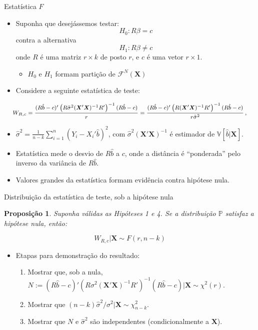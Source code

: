 \documentclass[11pt]{beamer}
\newtheorem{proposition}{Proposição}
\begin{document}
\begin{frame}{Estatística $F$}
	\begin{itemize}
		\item Suponha que desejássemos testar:
		\vspace{-0.5em}
		$$H_0: R\beta = c$$
		\vspace{-0.5em}
		contra a  alternativa
\vspace{-0.5em}
		$$H_1: R\beta \neq c$$
		onde $R$ é uma matriz $r \times k$ de posto $r$, e $c$ é uma vetor $r \times 1$.
		\begin{itemize}
			\item $H_0$ e $H_1$ formam partição de $\mathcal{F}^{N}(\boldsymbol{X})$
		\end{itemize}
		\item Considere a seguinte estatística de teste:
\end{itemize}
\vspace{0.8em}
		$$\footnotesize W_{R,c} = \frac{(R\hat{b}-c)'\left(R\hat{\sigma}^2(\boldsymbol{X}'\boldsymbol{X})^{-1}R'\right)^{-1}(R\hat{b}-c)}{r}  = \frac{(R\hat{b}-c)'\left(R(\boldsymbol{X}'\boldsymbol{X})^{-1}R'\right)^{-1}(R\hat{b}-c)}{r \hat{\sigma}^2}\, ,$$
	
		\begin{itemize}
			\item $\hat{\sigma}^2 = \frac{1}{n-k}\sum_{i=1}^n (Y_i -X_i'\hat{b})^2$, com $\hat{\sigma}^2 (\boldsymbol{X}'\boldsymbol{X})^{-1}$ é estimador de $\mathbb{V}[\hat{b}|\boldsymbol{X}]$.
			\item Estatística mede o desvio de $R\hat{b}$ a $c$, onde a distância é ``ponderada'' pelo inverso da variância de  $R\hat{b}$.
			\item Valores grandes da estatística formam evidência contra hipótese nula.
		\end{itemize}

\end{frame}

\begin{frame}{Distribuição da estatística de teste, sob a hipótese nula}
\begin{proposition}
	Suponha válidas as Hipóteses 1 e  4. Se a distribuição $\mathbb{P}$ satisfaz a hipótese nula, então:
	
	$$W_{R,c}|\boldsymbol{X}\sim F(r,n-k)$$
\end{proposition}
\begin{itemize}
	\item Etapas para demonstração do resultado:
	\begin{enumerate}
		\item Mostrar que, sob a nula, $N := (R\hat{b}-c)'\left(R\sigma^2(\boldsymbol{X}'\boldsymbol{X})^{-1}R'\right)^{-1}(R\hat{b}-c) |\boldsymbol{X}\sim \chi^2(r)$.
		\item Mostrar que $(n-k)\hat{\sigma}^2/\sigma^2|\boldsymbol{X} \sim \chi^2_{n-k}$.
		\item Mostrar que $N$ e $\hat{\sigma}^2$ são independentes (condicionalmente a $\boldsymbol{X}$).
	\end{enumerate}
\end{itemize}
\end{frame}
\end{document}
